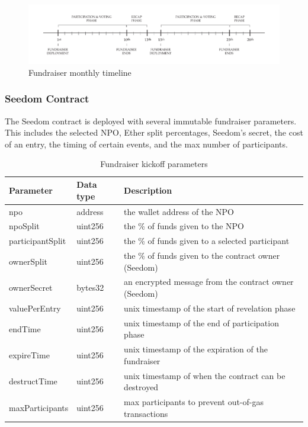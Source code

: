 \documentclass[11pt]{article}
\begin{document}
\begin{figure}[H]
\begin{center}
\includegraphics[width=1.0\textwidth]{./graphics/fundraiser-monthly-timeline.pdf}
\caption{Fundraiser monthly timeline}
\label{figure:fundraiserMonthlyTimeline}
\end{center}
\end{figure}

\subsubsection{Seedom Contract}

The Seedom contract is deployed with several immutable fundraiser parameters. This includes the selected NPO, Ether split percentages, Seedom's secret, the cost of an entry, the timing of certain events, and the max number of participants.

\begin{table}[H]
\begin{center}
\begin{tabular}{| l | l | l |}
\hline
\textbf{Parameter} & \textbf{Data type} & \textbf{Description} \\ \hline
npo & address & the wallet address of the NPO \\ \hline
npoSplit & uint256 & the \% of funds given to the NPO \\ \hline
participantSplit & uint256 & the \% of funds given to a selected participant \\ \hline
ownerSplit & uint256 & the \% of funds given to the contract owner (Seedom) \\ \hline
ownerSecret & bytes32 & an encrypted message from the contract owner (Seedom) \\ \hline
valuePerEntry & uint256 & unix timestamp of the start of revelation phase \\ \hline
endTime & uint256 & unix timestamp of the end of participation phase \\ \hline
expireTime & uint256 & unix timestamp of the expiration of the fundraiser \\ \hline
destructTime & uint256 & unix timestamp of when the contract can be destroyed \\ \hline
maxParticipants & uint256 & max participants to prevent out-of-gas transactions \\ \hline
\end{tabular}
\caption{Fundraiser kickoff parameters}
\label{tab:fundraiserKickoffParameters}
\end{center}
\end{table}
\end{document}
